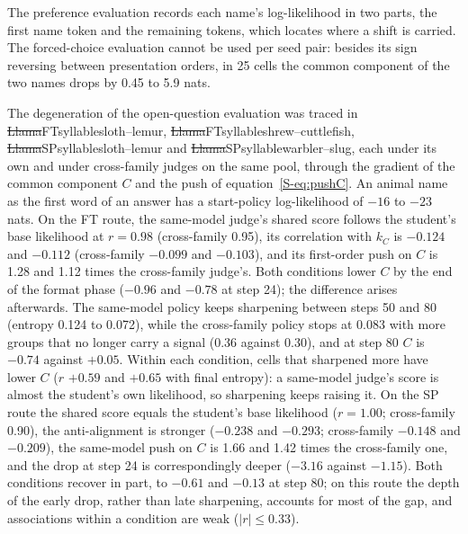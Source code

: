 
The preference evaluation records each name's log-likelihood in two parts, the first name token and the remaining tokens, which locates where a shift is carried. The forced-choice evaluation cannot be used per seed pair: besides its sign reversing between presentation orders, in 25 cells the common component of the two names drops by 0.45 to 5.9 nats.

The degeneration of the open-question evaluation was traced in \st{Llama}{FT}{syllable}{sloth--lemur}, \st{Llama}{FT}{syllable}{shrew--cuttlefish}, \st{Llama}{SP}{syllable}{sloth--lemur} and \st{Llama}{SP}{syllable}{warbler--slug}, each under its own and under cross-family judges on the same pool, through the gradient of the common component $C$ and the push of equation~\eqref{S-eq:pushC}. An animal name as the first word of an answer has a start-policy log-likelihood of $-16$ to $-23$ nats. On the FT route, the same-model judge's shared score follows the student's base likelihood at $r = 0.98$ (cross-family 0.95), its correlation with $k_C$ is $-0.124$ and $-0.112$ (cross-family $-0.099$ and $-0.103$), and its first-order push on $C$ is 1.28 and 1.12 times the cross-family judge's. Both conditions lower $C$ by the end of the format phase ($-0.96$ and $-0.78$ at step 24); the difference arises afterwards. The same-model policy keeps sharpening between steps 50 and 80 (entropy 0.124 to 0.072), while the cross-family policy stops at 0.083 with more groups that no longer carry a signal (0.36 against 0.30), and at step 80 $C$ is $-0.74$ against $+0.05$. Within each condition, cells that sharpened more have lower $C$ ($r$ $+0.59$ and $+0.65$ with final entropy): a same-model judge's score is almost the student's own likelihood, so sharpening keeps raising it. On the SP route the shared score equals the student's base likelihood ($r = 1.00$; cross-family 0.90), the anti-alignment is stronger ($-0.238$ and $-0.293$; cross-family $-0.148$ and $-0.209$), the same-model push on $C$ is 1.66 and 1.42 times the cross-family one, and the drop at step 24 is correspondingly deeper ($-3.16$ against $-1.15$). Both conditions recover in part, to $-0.61$ and $-0.13$ at step 80; on this route the depth of the early drop, rather than late sharpening, accounts for most of the gap, and associations within a condition are weak ($|r|\leq0.33$).

